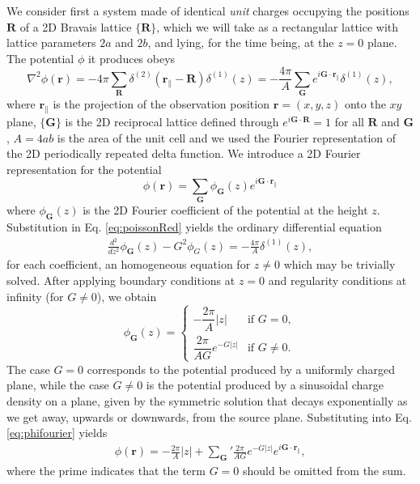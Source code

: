 \documentclass[review,sort&compress]{cas-sc}
\newcommand{\abs}[1]{\lvert#1\rvert}
\begin{document}
We consider first a system made of identical {\em unit} charges
occupying the positions $\bm R$ of a 2D Bravais lattice $\{\bm R\}$,
which we will take as a rectangular lattice with lattice parameters
$2a$ and $2b$, and lying, for the time being, at the $z=0$ plane.
The potential $\phi$ it produces obeys
\begin{equation}
  \label{eq:poissonRed}
  \nabla^2\phi(\bm r)=-4\pi\sum_{\bm R}\delta^{(2)}(\bm r_\|-\bm
  R)\delta^{(1)}(z)=-\frac{4\pi}{A}\sum_{\bm G}e^{i\bm G\cdot\bm r_\|}\delta^{(1)}(z),
\end{equation}
where $\bm r_\|$ is the projection of the observation position $\bm
r=(x,y,z)$ onto the $xy$ plane, $\{\bm G\}$ is the 2D
reciprocal lattice defined through $e^{i\bm G\cdot\bm R}=1$ for all
$\bm R$ and $\bm G$, $A=4ab$ is the area of the unit cell
and we used the Fourier representation of the 2D
periodically repeated delta function. We introduce a 2D Fourier representation for
the potential
\begin{equation}
  \label{eq:phifourier}
  \phi(\bm r)=\sum_{\bm G}\phi_{\bm G}(z)e^{i\bm G\cdot\bm r_\|}
\end{equation}
where $\phi_{\bm G}(z)$ is the 2D Fourier coefficient of the potential at
the height $z$. Substitution in Eq. \eqref{eq:poissonRed} yields the
ordinary differential equation
 \begin{eqnarray}
 \frac{d^2}{dz^2}\phi_{\bm G}(z)-G^2\phi_G(z)=
   -\frac{4 \pi}{A} \delta^{(1)}(z),
 \end{eqnarray}
for each coefficient, an homogeneous equation for $z\ne0$ which may be trivially
solved. After applying boundary conditions at $z=0$ and regularity
conditions at infinity (for $G\ne 0$), we obtain
\begin{equation}
  \label{eq:phiG}
  \phi_{\bm G}(z)=
  \begin{cases}
    -\dfrac{2\pi}{A}\abs{z}&\text{if }G=0,\\
    \dfrac{2 \pi}{AG}  e^{- G \abs{z}}&\text{if }G\neq 0.
  \end{cases}
\end{equation}
The case $G=0$ corresponds to the potential produced by a uniformly charged plane,
while the case $G\ne 0$ is the potential produced by a sinusoidal
charge density on a plane, given by the
symmetric solution that decays exponentially as we get away, upwards
or downwards, from
the source plane. Substituting into Eq. \eqref{eq:phifourier} yields
\begin{eqnarray}
  \label{eq:phiG1}
 \phi(\bm r) = -\frac{2 \pi}{A}  \abs{z} +{\sum_{\bm G}}' \frac{2 \pi
   }{AG} e^{- G \abs{z}} e^{i \bm G\cdot\bm r_\|},
 \end{eqnarray}
where the prime indicates that the term $G=0$ should be omitted from
the sum.
\end{document}
